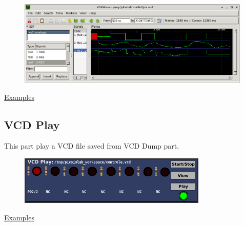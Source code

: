 \begin{figure}[H]
\center
\includegraphics[width=0.99\textwidth]{img/part_vcd_dump_gtkwave_an.png} 
\end{figure}

\href{https://lcgamboa.github.io/picsimlab_examples/examples/examples_index.html\#VCD_Dump_(Analogic)}{Examples}

 


\subsection{VCD Play}


This part play a VCD file saved from VCD Dump part.  

\begin{figure}[H]
\center
\includegraphics[width=0.8\textwidth]{img/part_vcd_play.png} 
\end{figure}


\href{https://lcgamboa.github.io/picsimlab_examples/examples/examples_index.html\#VCD_Play}{Examples}

